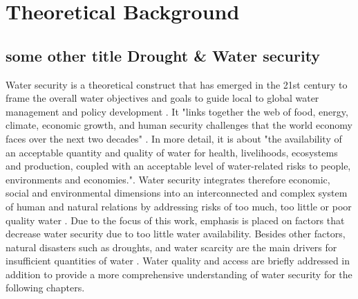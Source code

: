 
\chapter{Theoretical Background} %

\label{ChapterX} %



\section{some other title Drought \& Water security} %

Water security is a theoretical construct that has emerged in the 21st century to frame the overall water objectives and goals to guide local to global water management and policy development \autocite{sadoffWaterSecurity2020a}. It "links together the web of food, energy, climate, economic growth, and human security challenges that the world economy faces over the next two decades" \autocite[5]{wefBubbleCloseBursting2009}. In more detail, it is about "the availability of an acceptable quantity and quality of water for health, livelihoods, ecosystems and production, coupled with an acceptable level of water-related risks to people, environments and economies."\autocite{greySinkSwimWater2007}.
Water security integrates therefore economic, social and environmental dimensions into an interconnected and complex system of human and natural relations by addressing risks of too much, too little or poor quality water \autocite{vanbeekWaterSecurityPutting2014, mishraWaterSecurityChanging2021}. Due to the focus of this work, emphasis is placed on factors that decrease water security due to too little water availability. Besides other factors, natural disasters such as droughts, and water scarcity are the main drivers for insufficient quantities of water \autocite{caretta2022water}. Water quality and access are briefly addressed in addition to provide a more comprehensive  understanding of water security for the following chapters.

